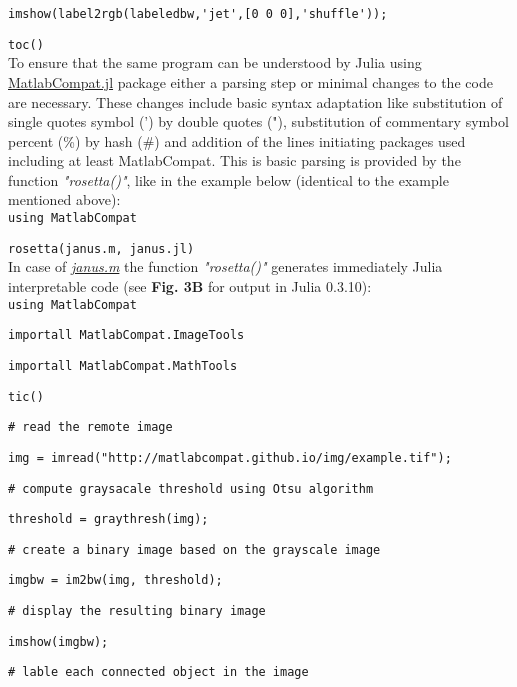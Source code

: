 \verb|imshow(label2rgb(labeledbw,'jet',[0 0 0],'shuffle'));|

\verb|toc()|\\



To ensure that the same program can be understood by Julia using \href{https://github.com/MatlabCompat/MatlabCompat.jl}{MatlabCompat.jl} package either a parsing step or minimal changes to the code are necessary. These changes include basic syntax adaptation like substitution of single quotes symbol (') by double quotes ("), substitution of commentary symbol percent (\%) by hash (\#) and addition of the lines initiating packages used including at least MatlabCompat. This is basic parsing is provided by the function \textit{"rosetta()"}, like in the example below (identical to the example mentioned above):\\



\verb|using MatlabCompat|

\verb|rosetta(janus.m, janus.jl)|\\



In case of \textit{\href{https://github.com/MatlabCompat/MatlabCompat.jl/blob/master/test/janus.m}{janus.m}} the function \textit{"rosetta()"} generates immediately Julia interpretable code (see \textbf{Fig. 3B} for output in Julia 0.3.10):\\



\verb|using MatlabCompat|

\verb|importall MatlabCompat.ImageTools|

\verb|importall MatlabCompat.MathTools|

\verb|tic()|

\verb|# read the remote image|

\verb|img = imread("http://matlabcompat.github.io/img/example.tif");|

\verb|# compute graysacale threshold using Otsu algorithm|

\verb|threshold = graythresh(img);|

\verb|# create a binary image based on the grayscale image|

\verb|imgbw = im2bw(img, threshold);|

\verb|# display the resulting binary image|

\verb|imshow(imgbw);|

\verb|# lable each connected object in the image|

